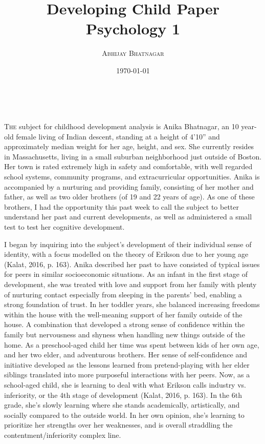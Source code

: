 \documentclass[a4paper, 10pt]{article}
\title{\textbf{Developing Child Paper}
\\ Psychology 1}
\author{\textsc{Abhijay Bhatnagar}}
\date{\today}
\makeatletter
\renewcommand{\maketitle}{
\begin{flushright}
{\LARGE\@title}

\vspace{0pt}

{\large\@author}
\\\@date

\vspace{0pt}
\end{flushright}
}
\makeatother
\begin{document}
\maketitle
\lettrine{T}{he} subject for childhood development analysis is Anika Bhatnagar, an 10 year-old female living of Indian descent, standing at a height of 4'10'' and approximately median weight for her age, height, and sex. She currently resides in Massachusetts, living in a small suburban neighborhood just outside of Boston. Her town is rated extremely high in safety and comfortable, with well regarded school systems, community programs, and extracurricular opportunities. Anika is accompanied by a nurturing and providing family, consisting of her mother and father, as well as two older brothers (of 19 and 22 years of age). As one of these brothers, I had the opportunity this past week to call the subject to better understand her past and current developments, as well as administered a small test to test her cognitive development.

	I began by inquiring into the subject's development of their individual sense of identity, with a focus modelled on the theory of Erikson due to her young age (Kalat, 2016, p. 163). Anika described her past to have consisted of typical issues for peers in similar socioeconomic situations. As an infant in the first stage of development, she was treated with love and support from her family with plenty of nurturing contact especially from sleeping in the parents' bed, enabling a strong foundation of trust. In her toddler years, she balanced increasing freedoms within the house with the well-meaning support of her family outside of the house. A combination that developed a strong sense of confidence within the family but nervousness and shyness when handling new things outside of the home. As a preschool-aged child her time was spent between kids of her own age, and her two elder, and adventurous brothers. Her sense of self-confidence and initiative developed as the lessons learned from pretend-playing with her elder siblings translated into more purposeful interactions with her peers. Now, as a school-aged child, she is learning to deal with what Erikson calls industry vs. inferiority, or the 4th stage of development (Kalat, 2016, p. 163). In the 6th grade, she's slowly learning where she stands academically, artistically, and socially compared to the outside world. In her own opinion, she's learning to prioritize her strengths over her weaknesses, and is overall straddling the contentment/inferiority complex line. 
	
\end{document}
